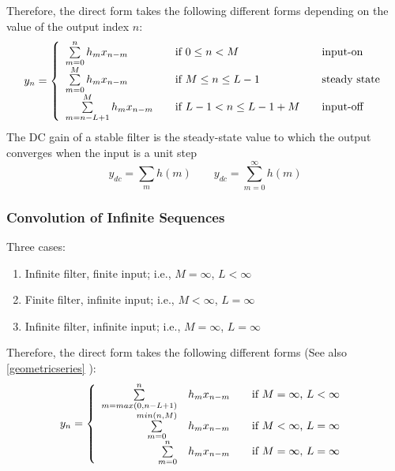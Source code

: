 Therefore, the direct form takes the following different forms depending
on the value of the output index $n$:
\[
	y_n =
		\left\{
			\begin{array}{l l l}
				\sum\limits_{m=0}^{n} h_m x_{n-m}		& \quad \text{if } 0 \leq n < M			& \quad \text{input-on} \\
				\sum\limits_{m=0}^{M} h_m x_{n-m}		& \quad \text{if } M \leq n \leq L-1	& \quad \text{steady state} \\
				\sum\limits_{m=n-L+1}^{M} h_m x_{n-m}	& \quad \text{if } L-1 < n \leq L-1+M	& \quad \text{input-off}
			\end{array}
		\right.
\]
The DC gain of a stable filter is the steady-state value to which the output converges when the input is a unit step
\[ y_{dc} = \sum_{m}^{} h(m) \qquad y_{dc}=\sum_{m=0}^{\infty}h(m) \]

\subsubsection{Convolution of Infinite Sequences}
Three cases:
\begin{enumerate}
  \item Infinite filter, finite input; i.e., $M = \infty$, $L < \infty$
  \item Finite filter, infinite input; i.e., $M < \infty$, $L = \infty$
  \item Infinite filter, infinite input; i.e., $M = \infty$, $L = \infty$
\end{enumerate}
\resetArrayStretch

Therefore, the direct form takes the following different forms (See also \ref{geometricseries} ):
\[
	y_n =
		\left\{
			\begin{array}{r l l}
				\sum\limits_{m=max(0,n-L+1)}^{n} & h_m x_{n-m}		& \quad \text{if $M = \infty$, $L < \infty$} \\	
				\sum\limits_{m=0}^{min(n,M)} & h_m x_{n-m}		& \quad \text{if $M < \infty$, $L = \infty$ } \\
				\sum\limits_{m=0}^{n} & h_m x_{n-m}	& \quad \text{if $M = \infty$, $L = \infty$ }
			\end{array}
		\right.
\]


